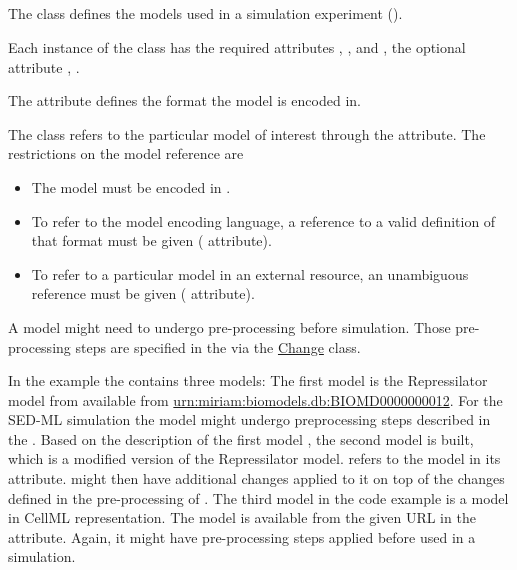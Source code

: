 \subsection{}
\label{class:model}
The  class defines the models used in a simulation experiment ().


Each instance of the  class has the required attributes \hyperref[sec:id]{}, \hyperref[sec:model_source]{}, and \hyperref[sec:language]{}, the optional attribute \hyperref[sec:name]{},  \hyperref[sec:changesModel]{}.

The \hyperref[sec:language]{} attribute defines the format the model is encoded in.

The  class refers to the particular model of interest through the \hyperref[sec:model_source]{} attribute. The restrictions on the model reference are
\begin{itemize}
 \item{The model must be encoded in .}
 \item{To refer to the model encoding language, a reference to a valid definition of that format must be given (\hyperref[sec:language]{} attribute).}
 \item{To refer to a particular model in an external resource, an unambiguous reference must be given (\hyperref[sec:model_source]{} attribute).}
\end{itemize}

A model might need to undergo pre-processing before simulation. Those pre-processing steps are specified in the \hyperref[sec:changesModel]{} via the \hyperref[class:change]{Change} class.


In the example the \hyperref[class:listOfModels]{} contains three models: The first model  is the Repressilator model from \biom available from \url{urn:miriam:biomodels.db:BIOMD0000000012}. For the SED-ML simulation the model might undergo preprocessing steps described in the \hyperref[sec:changesModel]{}. Based on the description of the first model , the second model  is built, which is a modified version of the Repressilator model.  refers to the model  in its \hyperref[sec:model_source]{} attribute.  might then have additional changes applied to it on top of the changes defined in the pre-processing of . The third model in the code example is a model in CellML representation. The model  is available from the given URL in the \hyperref[sec:model_source]{} attribute. Again, it might have pre-processing steps applied before used in a simulation.

